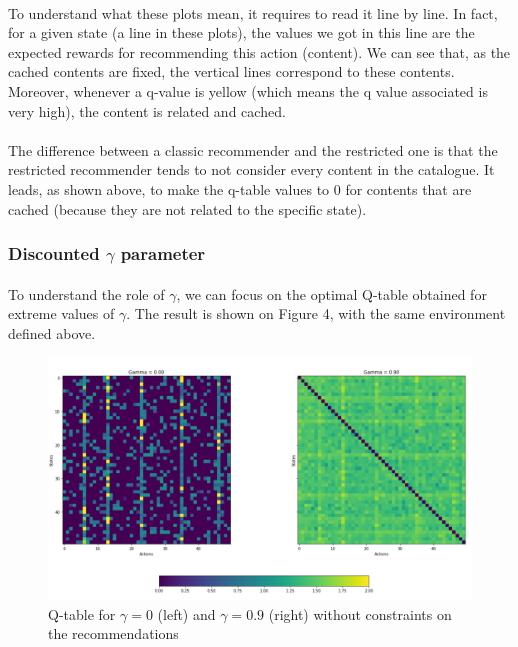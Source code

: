 \documentclass[a4paper]{article}
\begin{document}
	
	
\paragraph{}	To understand what these plots mean, it requires to read it line by line. In fact, for a given state (a line in these plots), the values we got in this line are the expected rewards for recommending this action (content). We can see that, as the cached contents are fixed, the vertical lines correspond to these contents. Moreover, whenever a q-value is yellow (which means the q value associated is very high), the content is related and cached. \\
\paragraph{} The difference between a classic recommender and the restricted one is that the restricted recommender tends to not consider every content in the catalogue. It leads, as shown above, to make the q-table values to 0 for contents that are cached (because they are not related to the specific state).
	 
	
	\subsubsection{Discounted $\gamma$ parameter}
	\paragraph{} To understand the role of $\gamma$, we can focus on the optimal Q-table obtained for extreme values of $\gamma$.
	The result is shown on Figure 4, with the same environment defined above.
	
    \begin{figure}[h!]
        \centering
        \includegraphics[scale = 0.3]{img/gamma_no_constraints.png}
        \caption{Q-table for $\gamma = 0$ (left) and $\gamma = 0.9$ (right) without constraints on the recommendations}
        \label{fig:my_label}
    \end{figure}
	
\end{document}
